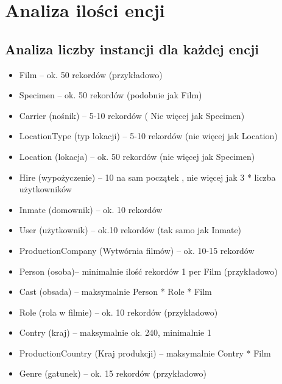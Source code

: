 \documentclass{article}
\begin{document}
\section{Analiza ilości encji}
\subsection{Analiza liczby instancji dla każdej encji}
\begin{itemize}
\item Film – ok. 50 rekordów (przykładowo)
\item Specimen – ok. 50 rekordów (podobnie jak Film)
\item Carrier (nośnik) – 5-10 rekordów ( Nie więcej jak Specimen)
\item LocationType (typ lokacji) – 5-10 rekordów (nie więcej jak Location)
\item Location (lokacja) – ok. 50 rekordów (nie więcej jak Specimen)
\item Hire (wypożyczenie) – 10 na sam początek , nie więcej jak 3 * liczba użytkowników
\item Inmate (domownik) – ok. 10 rekordów
\item User (użytkownik) – ok.10 rekordów (tak samo jak Inmate)
\item ProductionCompany (Wytwórnia filmów) – ok. 10-15 rekordów
\item Person (osoba)– minimalnie ilość rekordów 1 per Film (przykładowo)
\item Cast (obsada) – maksymalnie Person * Role * Film
\item Role (rola w filmie) – ok. 10 rekordów (przykładowo)
\item Contry (kraj) – maksymalnie ok. 240, minimalnie 1
\item ProductionCountry (Kraj produkcji) – maksymalnie Contry * Film
\item Genre (gatunek) – ok. 15 rekordów (przykładowo)
\end{itemize}
\end{document}
